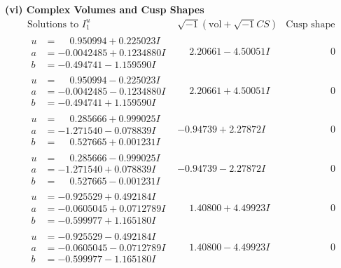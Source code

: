 \documentclass[1p]{elsarticle_modified}
\theoremstyle{definition}
\newcommand{\I}{\sqrt{-1}}
\begin{document}
\newpage\flushleft \textbf{(vi) Complex Volumes and Cusp Shapes}
$$\begin{array}{c|c|c}  
\text{Solutions to }I^u_{1}& \I (\text{vol} + \sqrt{-1}CS) & \text{Cusp shape}\\
 \hline 
\begin{aligned}
u &= \phantom{-}0.950994 + 0.225023 I \\
a &= -0.0042485 + 0.1234880 I \\
b &= -0.494741 - 1.159590 I\end{aligned}
 & \phantom{-}2.20661 - 4.50051 I & \phantom{-0.000000 } 0 \\ \hline\begin{aligned}
u &= \phantom{-}0.950994 - 0.225023 I \\
a &= -0.0042485 - 0.1234880 I \\
b &= -0.494741 + 1.159590 I\end{aligned}
 & \phantom{-}2.20661 + 4.50051 I & \phantom{-0.000000 } 0 \\ \hline\begin{aligned}
u &= \phantom{-}0.285666 + 0.999025 I \\
a &= -1.271540 - 0.078839 I \\
b &= \phantom{-}0.527665 + 0.001231 I\end{aligned}
 & -0.94739 + 2.27872 I & \phantom{-0.000000 } 0 \\ \hline\begin{aligned}
u &= \phantom{-}0.285666 - 0.999025 I \\
a &= -1.271540 + 0.078839 I \\
b &= \phantom{-}0.527665 - 0.001231 I\end{aligned}
 & -0.94739 - 2.27872 I & \phantom{-0.000000 } 0 \\ \hline\begin{aligned}
u &= -0.925529 + 0.492184 I \\
a &= -0.0605045 + 0.0712789 I \\
b &= -0.599977 + 1.165180 I\end{aligned}
 & \phantom{-}1.40800 + 4.49923 I & \phantom{-0.000000 } 0 \\ \hline\begin{aligned}
u &= -0.925529 - 0.492184 I \\
a &= -0.0605045 - 0.0712789 I \\
b &= -0.599977 - 1.165180 I\end{aligned}
 & \phantom{-}1.40800 - 4.49923 I & \phantom{-0.000000 } 0 \\ \hline\begin{aligned}

\end{aligned}
\end{array}$$
\end{document}
